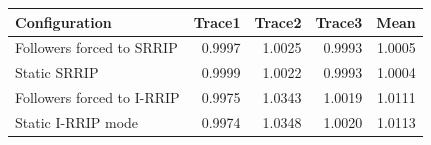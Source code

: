 \begin{tabular}{lrrrr}\toprule
Configuration & Trace1 & Trace2 & Trace3 & Mean \\ \midrule
Followers forced to SRRIP & 0.9997 & 1.0025 & 0.9993 & 1.0005 \\
Static SRRIP & 0.9999 & 1.0022 & 0.9993 & 1.0004 \\
Followers forced to I-RRIP & 0.9975 & 1.0343 & 1.0019 & 1.0111 \\
Static I-RRIP mode & 0.9974 & 1.0348 & 1.0020 & 1.0113 \\
\bottomrule\end{tabular}
